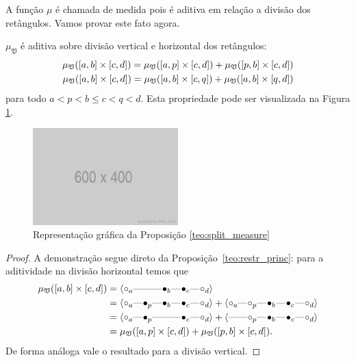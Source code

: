 A função $\mu$ é chamada de medida pois é aditiva em relação a divisão dos retângulos. 
Vamos provar este fato agora.

\begin{propo}\label{teo:split_measure}
    $\mu_{\mathfrak{V}}$ é aditiva sobre divisão vertical e horizontal dos retângulos:
    \begin{align*}
        \mu_{\mathfrak{V}}([a,b]\times[c,d]) = \mu_{\mathfrak{V}}([a,p]\times[c,d]) 
        + \mu_{\mathfrak{V}}([p,b] \times [c,d]) \\
        \mu_{\mathfrak{V}}([a,b]\times[c,d]) = \mu_{\mathfrak{V}}([a,b]\times[c,q]) 
        + \mu_{\mathfrak{V}}([a,b] \times [q,d])
    \end{align*}
    para todo $a < p < b \leq c < q < d$. Esta propriedade pode ser visualizada na Figura 
    \ref{fig:split_measure}.
    \begin{figure}[htpb!]
        \centering
        \includegraphics[width=0.5\textwidth]{images/placeholder.png}
        \caption{Representação gráfica da Proposição \ref{teo:split_measure}}
        \label{fig:split_measure}
    \end{figure}
\end{propo}
\begin{proof}
    A demonstração segue direto da Proposição~\ref{teo:restr_princ}: para a aditividade na divisão
    horizontal temos que
    \begin{align*}
        \mu_{\frakv}([a,b] \times [c,d]) & = \innerproduct{\qoff{a} \qem \qno \qem \qon{b} \qem \qon{c} \qem \qoff{d}} \\
        &=\innerproduct{\qoff{a} \qem \qon{p} \qem \qon{b} \qem \qon{c} \qem \qoff{d}}
          + \innerproduct{\qoff{a} \qem \qoff{p} \qem \qon{b} \qem \qon{c} \qem \qoff{d}} \\
        &=\innerproduct{\qoff{a} \qem \qon{p} \qem \qno \qem \qon{c} \qem \qoff{d}}
          + \innerproduct{\qno \qem \qoff{p} \qem \qon{b} \qem \qon{c} \qem \qoff{d}} \\
        &=\mu_{\frakv}([a,p] \times [c,d]) + \mu_{\frakv}([p,b] \times [c,d]).
    \end{align*}
    De forma análoga vale o resultado para a divisão vertical.  
\end{proof}

